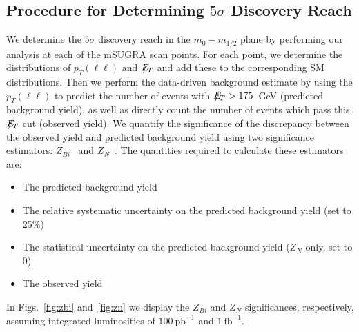 \subsection{Procedure for Determining $5\sigma$ Discovery Reach}
\label{sec:significance}

We  determine the  $5\sigma$  discovery reach  in the  $m_{0}-m_{1/2}$
plane by  performing our analysis at  each of the  mSUGRA scan points.
For each  point, we  determine the distributions  of $p_{T}(\ell\ell)$
and $E\!\!\!\!/_T$ and add these  to the corresponding SM distributions.  Then
we  perform   the  data-driven   background  estimate  by   using  the
$p_{T}(\ell\ell)$ to predict the  number of events with $E\!\!\!\!/_T>175$~GeV
(predicted background yield), as well  as directly count the number of
events which pass  this $E\!\!\!\!/_T$ cut (observed yield).   We quantify the
significance  of  the  discrepancy  between  the  observed  yield  and
predicted   background  yield   using  two   significance  estimators:
$Z_{Bi}$~\cite{cite:cousins}    and    $Z_N$~\cite{cite:conway}.   The
quantities required to calculate these estimators are:

\begin{itemize}
\item The predicted background yield
\item The relative systematic  uncertainty on the predicted background
yield (set to 25\%)
\item The  statistical uncertainty  on the predicted  background yield
($Z_N$ only, set to 0)
\item The observed yield
\end{itemize}

In   Figs.~\ref{fig:zbi} and~\ref{fig:zn} we   display  the
$Z_{Bi}$ and $Z_{N}$  significances, respectively,  assuming    integrated    luminosities   of
$100~\mathrm{pb}^{-1}$  and  $1~\mathrm{fb}^{-1}$.

